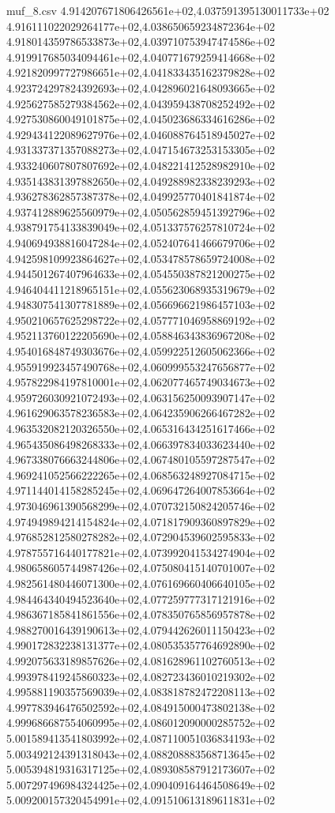 \begin{filecontents*}{muf_8.csv}
4.914207671806426561e+02,4.037591395130011733e+02
4.916111022029264177e+02,4.038650659234872364e+02
4.918014359786533873e+02,4.039710753947474586e+02
4.919917685034094461e+02,4.040771679259414668e+02
4.921820997727986651e+02,4.041833435162379828e+02
4.923724297824392693e+02,4.042896021648093665e+02
4.925627585279384562e+02,4.043959438708252492e+02
4.927530860049101875e+02,4.045023686334616286e+02
4.929434122089627976e+02,4.046088764518945027e+02
4.931337371357088273e+02,4.047154673253153305e+02
4.933240607807807692e+02,4.048221412528982910e+02
4.935143831397882650e+02,4.049288982338239293e+02
4.936278362857387378e+02,4.049925770401841874e+02
4.937412889625560979e+02,4.050562859451392796e+02
4.938791754133839049e+02,4.051337576257810724e+02
4.940694938816047284e+02,4.052407641466679706e+02
4.942598109923864627e+02,4.053478578659724008e+02
4.944501267407964633e+02,4.054550387821200275e+02
4.946404411218965151e+02,4.055623068935319679e+02
4.948307541307781889e+02,4.056696621986457103e+02
4.950210657625298722e+02,4.057771046958869192e+02
4.952113760122205690e+02,4.058846343836967208e+02
4.954016848749303676e+02,4.059922512605062366e+02
4.955919923457490768e+02,4.060999553247656877e+02
4.957822984197810001e+02,4.062077465749034673e+02
4.959726030921072493e+02,4.063156250093907147e+02
4.961629063578236583e+02,4.064235906266467282e+02
4.963532082120326550e+02,4.065316434251617466e+02
4.965435086498268333e+02,4.066397834033623440e+02
4.967338076663244806e+02,4.067480105597287547e+02
4.969241052566222265e+02,4.068563248927084715e+02
4.971144014158285245e+02,4.069647264007853664e+02
4.973046961390568299e+02,4.070732150824205746e+02
4.974949894214154824e+02,4.071817909360897829e+02
4.976852812580278282e+02,4.072904539602595833e+02
4.978755716440177821e+02,4.073992041534274904e+02
4.980658605744987426e+02,4.075080415140701007e+02
4.982561480446071300e+02,4.076169660406640105e+02
4.984464340494523640e+02,4.077259777317121916e+02
4.986367185841861556e+02,4.078350765856957878e+02
4.988270016439190613e+02,4.079442626011150423e+02
4.990172832238131377e+02,4.080535357764692890e+02
4.992075633189857626e+02,4.081628961102760513e+02
4.993978419245860323e+02,4.082723436010219302e+02
4.995881190357569039e+02,4.083818782472208113e+02
4.997783946476502592e+02,4.084915000473802138e+02
4.999686687554060995e+02,4.086012090000285752e+02
5.001589413541803992e+02,4.087110051036834193e+02
5.003492124391318043e+02,4.088208883568713645e+02
5.005394819316317125e+02,4.089308587912173607e+02
5.007297496984324425e+02,4.090409164464508649e+02
5.009200157320454991e+02,4.091510613189611831e+02

\end{filecontents*}
